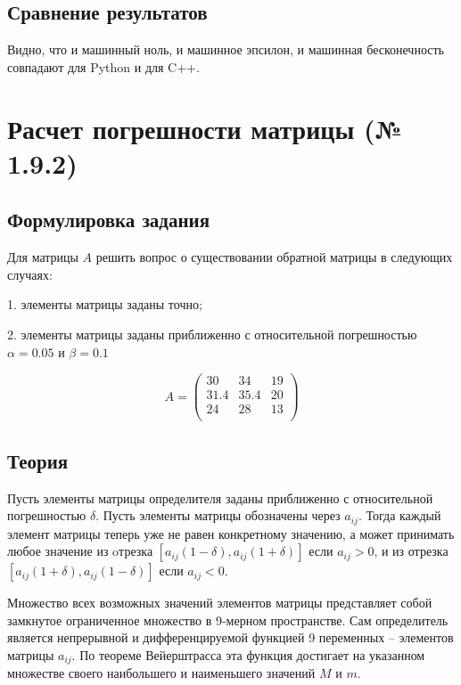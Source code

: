 \documentclass[a4paper,11pt]{article}
\theoremstyle{definition} %
\theoremstyle{remark} %
\begin{document}
\subsection{Сравнение результатов}

Видно, что и машинный ноль, и машинное эпсилон, и машинная бесконечность совпадают для Python и для C++.

\newpage
\section{Расчет погрешности матрицы (№ 1.9.2)}

\subsection{Формулировка задания}

Для матрицы $A$ решить вопрос о существовании обратной матрицы в следующих случаях:

1. элементы матрицы заданы точно;

2. элементы матрицы заданы приближенно с относительной погрешностью $\alpha = 0.05$ и $\beta = 0.1$

$$
A =
\begin{pmatrix}
    30 & 34 & 19 \\
    31.4 & 35.4 & 20 \\
    24 & 28 & 13 \\
\end{pmatrix}
$$

\subsection{Теория}

Пусть элементы матрицы определителя заданы приближенно с относительной погрешностью $\delta$. 
Пусть элементы матрицы обозначены через $a_{ij}$.
Тогда каждый элемент матрицы теперь уже не равен конкретному значению, а может принимать любое значение из oтрезка
$[a_{ij} (1 - \delta), a_{ij} (1 + \delta )]$ если $a_{ij} > 0$,
и из отрезка $[a_{ij} (1 + \delta), a_{ij} (1 - \delta )]$ если $a_{ij} < 0$.

Множество всех возможных значений элементов матрицы представляет собой замкнутое ограниченное множество в 9-мерном пространстве. 
Сам определитель является непрерывной и дифференцируемой функцией 9 переменных -- элементов матрицы $a_{ij}$.
По теореме Вейерштрасса эта функция достигает на указанном множестве своего наибольшего и наименьшего значений $M$ и $m$.
\end{document}
